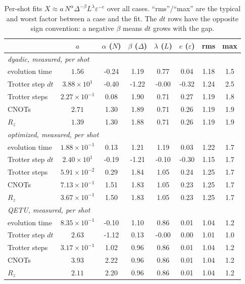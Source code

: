 \documentclass[10pt]{article}
\begin{document}
\begin{table}[h]\centering\small
\caption{Per-shot fits $X\approx a\,N^{\alpha}\Delta^{-\beta}L^{\lambda}\varepsilon^{-e}$ over all cases.
``rms''/``max'' are the typical and worst factor between a case and the fit. The $dt$ rows have the opposite
sign convention: a negative $\beta$ means $dt$ grows with the gap.}\label{tab:fit}
\begin{tabular}{lccccccc}\toprule
 & $a$ & $\alpha$ ($N$) & $\beta$ ($\Delta$) & $\lambda$ ($L$) & $e$ ($\varepsilon$) & rms & max \\\midrule
\multicolumn{8}{l}{\emph{dyadic, measured, per shot}} \\
\quad evolution time & $1.56$ & -0.24 & 1.19 & 0.77 & 0.04 & 1.18 & 1.5 \\
\quad Trotter step $dt$ & $3.88\times10^{1}$ & -0.40 & -1.22 & -0.00 & -0.32 & 1.24 & 2.5 \\
\quad Trotter steps & $2.27\times10^{-1}$ & 0.08 & 1.90 & 0.71 & 0.27 & 1.19 & 1.8 \\
\quad CNOTs & $2.71$ & 1.30 & 1.89 & 0.71 & 0.26 & 1.19 & 1.9 \\
\quad $R_z$ & $1.39$ & 1.30 & 1.88 & 0.71 & 0.26 & 1.19 & 1.9 \\
\multicolumn{8}{l}{\emph{optimized, measured, per shot}} \\
\quad evolution time & $1.88\times10^{-1}$ & 0.13 & 1.21 & 1.19 & 0.03 & 1.22 & 1.7 \\
\quad Trotter step $dt$ & $2.40\times10^{1}$ & -0.19 & -1.21 & -0.10 & -0.30 & 1.15 & 1.7 \\
\quad Trotter steps & $5.91\times10^{-2}$ & 0.29 & 1.84 & 1.05 & 0.24 & 1.25 & 1.7 \\
\quad CNOTs & $7.13\times10^{-1}$ & 1.51 & 1.83 & 1.05 & 0.23 & 1.25 & 1.7 \\
\quad $R_z$ & $3.67\times10^{-1}$ & 1.50 & 1.83 & 1.05 & 0.23 & 1.25 & 1.7 \\
\multicolumn{8}{l}{\emph{QETU, measured, per shot}} \\
\quad evolution time & $8.35\times10^{-1}$ & -0.10 & 1.10 & 0.86 & 0.01 & 1.04 & 1.2 \\
\quad Trotter step $dt$ & $2.63$ & -1.12 & 0.13 & -0.00 & 0.00 & 1.01 & 1.0 \\
\quad Trotter steps & $3.17\times10^{-1}$ & 1.02 & 0.96 & 0.86 & 0.01 & 1.04 & 1.2 \\
\quad CNOTs & $3.93$ & 2.22 & 0.96 & 0.86 & 0.01 & 1.04 & 1.2 \\
\quad $R_z$ & $2.11$ & 2.20 & 0.96 & 0.86 & 0.01 & 1.04 & 1.2 \\

\end{tabular}
\end{table}
\end{document}
